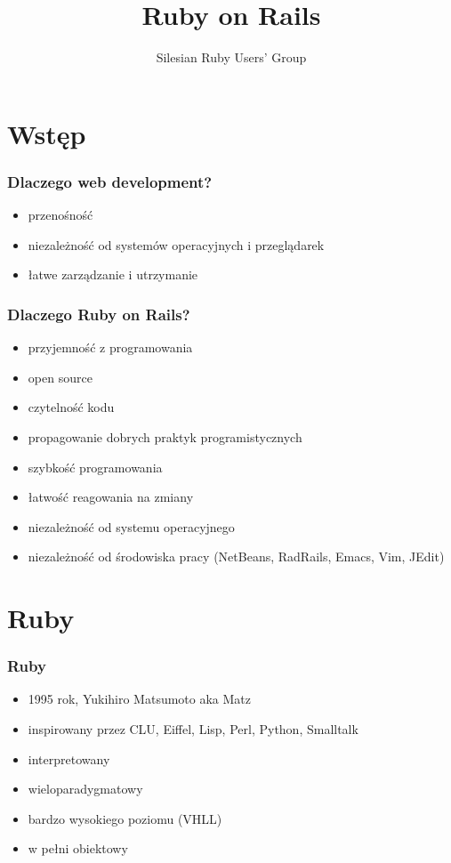 \documentclass[12t]{beamer}
\author{Silesian Ruby Users' Group}
\title{Ruby on Rails}
\begin{document}
\frame{\titlepage}

\section{Wstęp}
\begin{frame}
  \frametitle{Dlaczego web development?}
  \begin{itemize}
  \item przenośność
  \item niezależność od systemów operacyjnych i przeglądarek
  \item łatwe zarządzanie i utrzymanie
  \end{itemize}
\end{frame}

\begin{frame}
  \frametitle{Dlaczego Ruby on Rails?}
  \begin{itemize}
  \item przyjemność z programowania
  \item open source
  \item czytelność kodu
  \item propagowanie dobrych praktyk programistycznych
  \item szybkość programowania
  \item łatwość reagowania na zmiany
  \item niezależność od systemu operacyjnego
  \item niezależność od środowiska pracy (NetBeans, RadRails, Emacs,
    Vim, JEdit)
  \end{itemize}
\end{frame}

\section{Ruby}
\begin{frame}
  \frametitle{Ruby}
  \begin{itemize}
  \item 1995 rok, Yukihiro Matsumoto aka Matz
  \item inspirowany przez CLU, Eiffel, Lisp, Perl, Python, Smalltalk
  \item interpretowany
  \item wieloparadygmatowy
  \item bardzo wysokiego poziomu (VHLL)
  \item w pełni obiektowy
  \end{itemize}
\end{frame}
\end{document}
